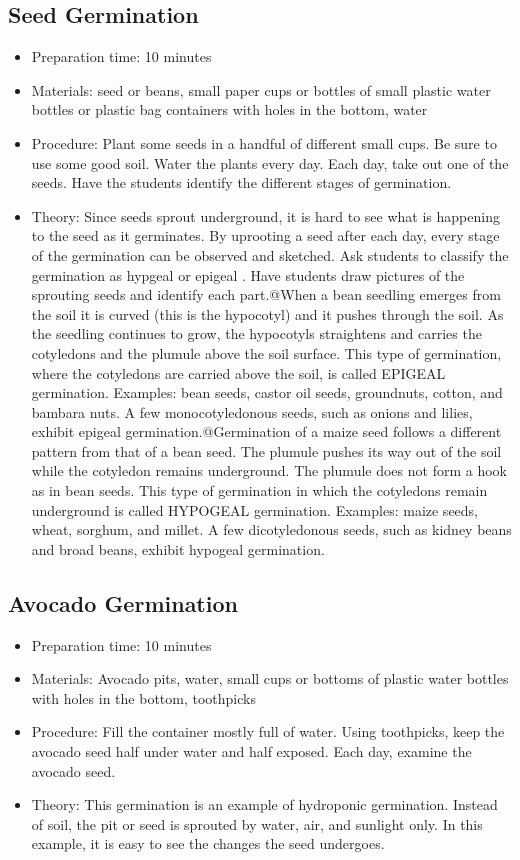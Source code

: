 \subsection{Seed Germination}
\begin{itemize}
\item{Preparation time: 10 minutes}
\item{Materials: seed or beans, small paper cups or bottles of small plastic water bottles or plastic bag containers with holes in the bottom, water}
\item{Procedure: Plant some seeds in a handful of different small cups. Be sure to use some good soil. Water the plants every day. Each day, take out one of the seeds. Have the students identify the different stages of germination.}
\item{Theory: Since seeds sprout underground, it is hard to see what is happening to the seed as it germinates. By uprooting a seed after each day, every stage of the germination can be observed and sketched. Ask students to classify the germination as hypgeal or epigeal . Have students draw pictures of the sprouting seeds and identify each part.@When a bean seedling emerges from the soil it is curved (this is the hypocotyl) and it pushes through the soil. As the seedling continues to grow, the hypocotyls straightens and carries the cotyledons and the plumule above the soil surface. This type of germination, where the cotyledons are carried above the soil, is called EPIGEAL germination. Examples: bean seeds, castor oil seeds, groundnuts, cotton, and bambara nuts. A few monocotyledonous seeds, such as onions and lilies, exhibit epigeal germination.@Germination of a maize seed follows a different pattern from that of a bean seed. The plumule pushes its way out of the soil while the cotyledon remains underground. The plumule does not form a hook as in bean seeds. This type of germination in which the cotyledons remain underground is called HYPOGEAL germination. Examples: maize seeds, wheat, sorghum, and millet. A few dicotyledonous seeds, such as kidney beans and broad beans, exhibit hypogeal germination.}
\end{itemize}

\subsection{Avocado Germination}
\begin{itemize}
\item{Preparation time: 10 minutes}
\item{Materials: Avocado pits, water, small cups or bottoms of plastic water bottles with holes in the bottom, toothpicks}
\item{Procedure: Fill the container mostly full of water. Using toothpicks, keep the avocado seed half under water and half exposed. Each day, examine the avocado seed.}
\item{Theory: This germination is an example of hydroponic germination. Instead of soil, the pit or seed is sprouted by water, air, and sunlight only. In this example, it is easy to see the changes the seed undergoes.}
\end{itemize}

